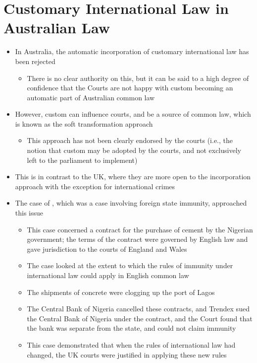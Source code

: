 \section{Customary International Law in Australian Law}\label{sec:Customary International Law in Australian Law}
\begin{itemize}
    \item In Australia, the automatic incorporation of customary international law has been rejected
    \begin{itemize}
        \item There is no clear authority on this, but it can be said to a high degree of confidence that the Courts are not happy with custom becoming an automatic part of Australian common law
    \end{itemize}
    \item However, custom can influence courts, and be a source of common law, which is known as the soft transformation approach
    \begin{itemize}
        \item This approach has not been clearly endorsed by the courts (i.e., the notion that custom may be adopted by the courts, and not exclusively left to the parliament to implement)
    \end{itemize}
    \item This is in contrast to the UK, where they are more open to the incorporation approach with the exception for international crimes
    \item The case of , which was a case involving foreign state immunity, approached this issue
    \begin{itemize}
        \item This case concerned a contract for the purchase of cement by the Nigerian government; the terms of the contract were governed by English law and gave jurisdiction to the courts of England and Wales
        \item The case looked at the extent to which the rules of immunity under international law could apply in English common law
        \item The shipments of concrete were clogging up the port of Lagos
        \item The Central Bank of Nigeria cancelled these contracts, and Trendex sued the Central Bank of Nigeria under the contract, and the Court found that the bank was separate from the state, and could not claim immunity
        \item This case demonstrated that when the rules of international law had changed, the UK courts were justified in applying these new rules

\end{itemize}
\end{itemize}
